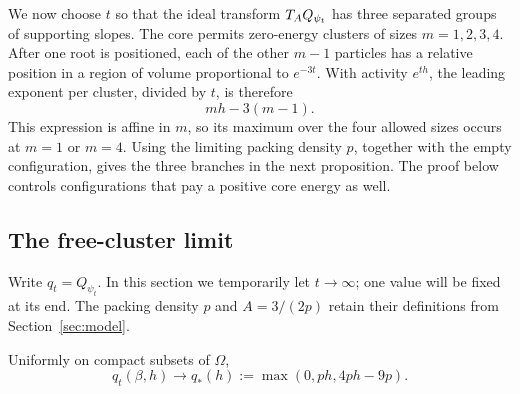 We now choose \(t\) so that the ideal transform \(T_AQ_{\psi_t}\)
has three separated groups of supporting slopes. The core permits
zero-energy clusters of sizes \(m=1,2,3,4\). After one root is positioned,
each of the other \(m-1\) particles has a relative position in a region
of volume proportional to \(e^{-3t}\). With activity \(e^{th}\), the
leading exponent per cluster, divided by \(t\), is therefore
\[
 mh-3(m-1).
\]
This expression is affine in \(m\), so its maximum over the four allowed
sizes occurs at \(m=1\) or \(m=4\). Using the limiting packing density
\(p\), together with the empty configuration, gives the three branches
in the next proposition. The proof below controls configurations that
pay a positive core energy as well.

\subsection{The free-cluster limit}

Write \(q_t=Q_{\psi_t}\).  In this section we temporarily let
\(t\to\infty\); one value will be fixed at its end.
The packing density \(p\) and \(A=3/(2p)\) retain their definitions
from Section~\ref{sec:model}.

\begin{proposition}\label{prop:free-pressure}
Uniformly on compact subsets of \(\Omega\),
\begin{equation}\label{eq:free-pressure-limit}
 q_t(\beta,h)\longrightarrow
 q_*(h):=\max(0,ph,4ph-9p).
\end{equation}
\end{proposition}

